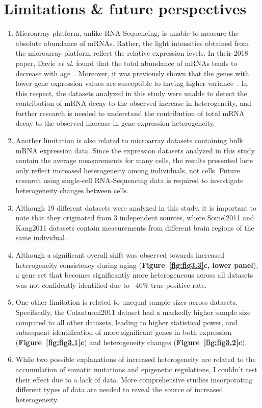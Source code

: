 \section{Limitations \& future perspectives}
\begin{enumerate}
    \item Microarray platform, unlike RNA-Sequencing, is unable to measure the absolute abundance of mRNAs. 
    Rather, the light intensities obtained from the microarray platform reflect the relative expression levels.
    In their 2018 paper, Davie \textit{et al.} found that the total abundance of mRNAs tends to decrease with age~\autocite{Davie2018}.
    Moreover, it was previously shown that the genes with lower gene expression values are susceptible to having higher variance~\autocite{Aris2004}.
    In this respect, the datasets analyzed in this study were unable to detect the contribution of mRNA decay to the observed increase in heterogeneity, and
    further research is needed to understand the contribution of total mRNA decay to the observed increase in gene expression heterogeneity.
    
    \item Another limitation is also related to microarray datasets containing bulk mRNA expression data.
    Since the expression datasets analyzed in this study contain the average measurements for many cells,
    the results presented here only reflect increased heterogeneity among individuals, not cells.
    Future research using single-cell RNA-Sequencing data is required to investigate heterogeneity changes between cells.
    \item Although 19 different datasets were analyzed in this study, it is important to note that they originated from 3 independent sources,
    where Somel2011 and Kang2011 datasets contain measurements from different brain regions of the same individual.
    \item Although a significant overall shift was observed towards increased heterogeneity consistency during aging (\textbf{Figure~\ref{fig:fig3.3}c, lower panel}),
    a gene set that becomes significantly more heterogeneous across all datasets was not confidently identified due to ~40\% true positive rate.
    \item One other limitation is related to unequal sample sizes across datasets. 
    Specifically, the Colantuoni2011 dataset had a markedly higher sample size compared to all other datasets,
    leading to higher statistical power, and subsequent identification of more significant genes in both expression (\textbf{Figure~\ref{fig:fig3.1}c}) 
    and heterogeneity changes (\textbf{Figure~\ref{fig:fig3.2}c}).
    \item While two possible explanations of increased heterogeneity are related to the accumulation of somatic mutations and epigenetic regulations,
    I couldn't test their effect due to a lack of data. 
    More comprehensive studies incorporating different types of data are needed to reveal the source of increased heterogeneity.
\end{enumerate}
